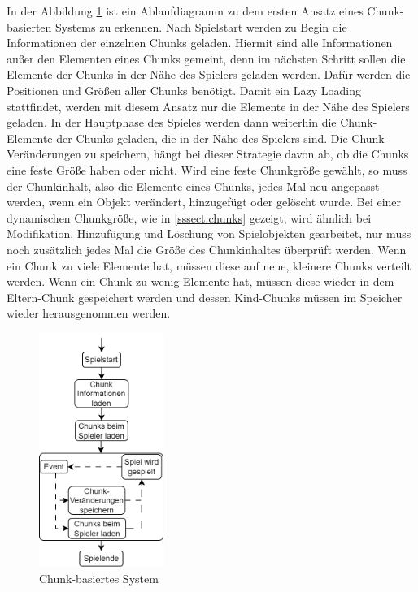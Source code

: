 In der Abbildung \ref{fig:chunkBasedSystem} ist ein Ablaufdiagramm zu dem ersten Ansatz eines Chunk-basierten Systems zu erkennen. Nach Spielstart werden zu Begin die Informationen der einzelnen Chunks geladen. Hiermit sind alle Informationen außer den Elementen eines Chunks gemeint, denn im nächsten Schritt sollen die Elemente der Chunks in der Nähe des Spielers geladen werden. Dafür werden die Positionen und Größen aller Chunks benötigt. Damit ein Lazy Loading stattfindet, werden mit diesem Ansatz nur die Elemente in der Nähe des Spielers geladen. In der Hauptphase des Spieles werden dann weiterhin die Chunk-Elemente der Chunks geladen, die in der Nähe des Spielers sind. Die Chunk-Veränderungen zu speichern, hängt bei dieser Strategie davon ab, ob die Chunks eine feste Größe haben oder nicht. Wird eine feste Chunkgröße gewählt, so muss der Chunkinhalt, also die Elemente eines Chunks, jedes Mal neu angepasst werden, wenn ein Objekt verändert, hinzugefügt oder gelöscht wurde.  Bei einer dynamischen Chunkgröße, wie in \ref{sssect:chunks} gezeigt, wird ähnlich bei Modifikation, Hinzufügung und Löschung von Spielobjekten gearbeitet, nur muss noch zusätzlich jedes Mal die Größe des Chunkinhaltes überprüft werden. Wenn ein Chunk zu viele Elemente hat, müssen diese auf neue, kleinere Chunks verteilt werden. Wenn ein Chunk zu wenig Elemente hat, müssen diese wieder in dem Eltern-Chunk gespeichert werden und dessen Kind-Chunks müssen im Speicher wieder herausgenommen werden.

\begin{figure}[htp]
    \centering
    \includegraphics[width=0.36\textwidth]{images/Chunkbasiert.png}
    \caption{Chunk-basiertes System}
    \label{fig:chunkBasedSystem}
\end{figure}

